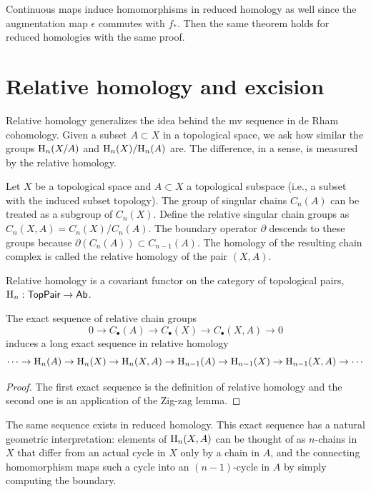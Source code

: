 Continuous maps induce homomorphisms in reduced homology as well since the augmentation map $\epsilon$ commutes with $f_\ast$. Then the same theorem holds for reduced homologies with the same proof.




\section{Relative homology and excision}

Relative homology generalizes the idea behind the \gls{mv} sequence in de Rham cohomology. Given a subset $A\subset X$ in a topological space, we ask how similar the groups $\mathrm{H}_n(X/A)$ and $\mathrm{H}_n(X)/\mathrm{H}_n(A)$ are. The difference, in a sense, is measured by the relative homology.

\begin{defn}
    Let $X$ be a topological space and $A\subset X$ a topological subspace (i.e., a subset with the induced subset topology). The group of singular chains $C_n(A)$ can be treated as a subgroup of $C_n(X)$. Define the relative singular chain groups as $C_n(X,A)=C_n(X)/C_n(A)$. The boundary operator $\partial$ descends to these groups because $\partial(C_n(A))\subset C_{n-1}(A)$. The homology of the resulting chain complex is called the relative homology of the pair $(X,A)$.
\end{defn}

Relative homology is a covariant functor on the category of topological pairs, $\mathrm{H}_n:\mathsf{TopPair}\to \mathsf{Ab}$.

\begin{prop}\label{exact seq of a pair}
    The exact sequence of relative chain groups
    \[0\to C_\bullet(A)\to C_\bullet (X)\to C_\bullet(X,A)\to 0 \]
    induces a long exact sequence in relative homology
    \[\cdots \to \mathrm{H}_n(A)\to \mathrm{H}_n(X)\to \mathrm{H}_n(X,A)\to \mathrm{H}_{n-1}(A)\to \mathrm{H}_{n-1}(X)\to \mathrm{H}_{n-1}(X,A)\to \cdots\]
\end{prop}
\begin{proof}
     The first exact sequence is the definition of relative homology and the second one is an application of the Zig-zag lemma.
\end{proof}

The same sequence exists in reduced homology. This exact sequence has a natural geometric interpretation: elements of $\mathrm{H}_n(X,A)$ can be thought of as $n$-chains in $X$ that differ from an actual cycle in $X$ only by a chain in $A$, and the connecting homomorphism maps such a cycle into an $(n-1)$-cycle in $A$ by simply computing the boundary.

